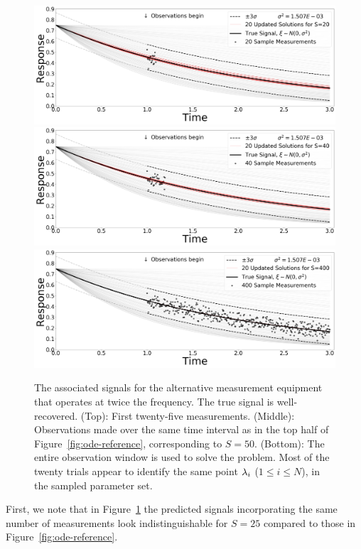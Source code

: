 \begin{figure}[htbp]
  \includegraphics[width=\linewidth]{figures/ode/ode-alt_20_reference_solution}
  \includegraphics[width=\linewidth]{figures/ode/ode-alt_40_reference_solution}
  \includegraphics[width=\linewidth]{figures/ode/ode-alt_400_reference_solution}
  \caption{The associated signals for the alternative measurement equipment that operates at twice the frequency.
  The true signal is well-recovered.
  (Top): First twenty-five measurements.
  (Middle): Observations made over the same time interval as in the top half of Figure~\ref{fig:ode-reference}, corresponding to $S=50$.
  (Bottom): The entire observation window is used to solve the problem. Most of the twenty trials appear to identify the same point $\lambda_i$ ($1\leq i \leq N$), in the sampled parameter set.
  }
  \label{fig:ode-alt-reference}
\end{figure}
First, we note that in Figure~\ref{fig:ode-alt-reference} the predicted signals incorporating the same number of measurements look indistinguishable for $S=25$ compared to those in Figure~\ref{fig:ode-reference}.



